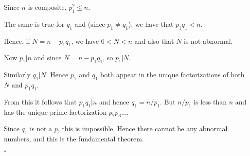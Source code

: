 \documentclass[11pt, oneside]{article}
\begin{document}
Since $n$ is composite, $p_1^2 \le n$.

The same is true for $q_1$ and (since $p_1 \ne q_1$), we have that $p_1 q_1 < n$.

Hence, if $N = n - p_1 q_1$, we have $0 < N < n$ and also that $N$ is not abnormal.

Now $p_1 | n$ and since $N = n - p_1 q_1$, so $p_1 | N$.

Similarly $q_1 | N$.  Hence $p_1$ and $q_1$ both appear in the unique factorizations of both $N$ and $p_1 q_1$.

From this it follows that $p_1 q_1 | n$ and hence $q_1 = n/p_1$.  But $n/p_1$ is less than $n$ and has the unique prime factorization $p_2 p_3 \dots$.

Since $q_1$ is not a $p$, this is impossible.  Hence there cannot be any abnormal numbers, and this is the fundamental theorem.

$\square$
\end{document}
